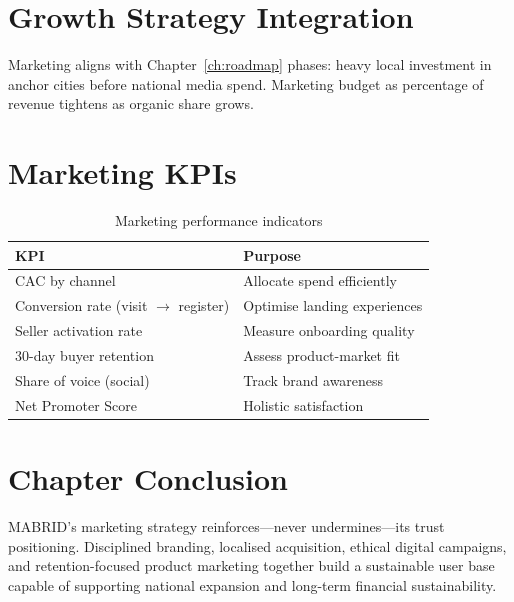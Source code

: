 \section{Growth Strategy Integration}

Marketing aligns with Chapter~\ref{ch:roadmap} phases: heavy local investment in anchor cities before national media spend. Marketing budget as percentage of revenue tightens as organic share grows.

\section{Marketing KPIs}

\begin{table}[H]
  \centering
  \caption{Marketing performance indicators}
  \label{tab:marketing-kpis}
  \begin{tabularx}{\textwidth}{@{}lX@{}}
    \toprule
    \textbf{KPI} & \textbf{Purpose} \\
    \midrule
    CAC by channel & Allocate spend efficiently \\
    Conversion rate (visit $\rightarrow$ register) & Optimise landing experiences \\
    Seller activation rate & Measure onboarding quality \\
    30-day buyer retention & Assess product-market fit \\
    Share of voice (social) & Track brand awareness \\
    Net Promoter Score & Holistic satisfaction \\
    \bottomrule
  \end{tabularx}
\end{table}

\section{Chapter Conclusion}

MABRID's marketing strategy reinforces---never undermines---its trust positioning. Disciplined branding, localised acquisition, ethical digital campaigns, and retention-focused product marketing together build a sustainable user base capable of supporting national expansion and long-term financial sustainability.
